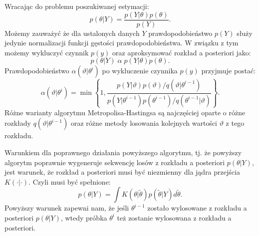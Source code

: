 Wracając do problemu poszukiwanej estymacji:
\begin{equation}
    p(\theta|Y) = \frac{p(Y|\theta)p(\theta)}{p(Y)}.
\end{equation}
Możemy zauważyć że dla ustalonych danych $Y$ prawdopodobieństwo $p(Y)$ służy jedynie normalizacji funkcji gęstości prawdopodobieństwa. W związku z tym możemy wykluczyć czynnik $p(y)$ oraz aproksymować rozkład a posteriori jako:
\begin{equation}
    p(\theta|Y)\;\alpha\;p(Y|\theta)p(\theta).
\end{equation}
Prawdopodobieństwo $\alpha(\vartheta | \theta^i)$ po wykluczenie czynnika $p(y)$ przyjmuje postać:
\begin{equation}
    \alpha(\vartheta|\theta^i) = \min \left\{ 1, \frac{p(Y|\vartheta)p(\vartheta)/q(\vartheta|\theta^{i-1})}{p(Y|\theta^{i-1})p(\theta^{i-1})/q(\theta^{i-1}|\vartheta)}\right\}.
\end{equation}
Różne warianty algorytmu Metropolisa-Hastingsa są najczęściej oparte o różne rozkłady $q(\vartheta|\theta^{i-1})$ oraz różne metody losowania kolejnych wartości $\vartheta$ z tego rozkładu. 

Warunkiem dla poprawnego działania powyższego algorytmu, tj. że powyższy algorytm poprawnie wygeneruje sekwencję losów z rozkładu a posteriori $p(\theta|Y)$, jest warunek, że rozkład a posteriori musi być niezmienny dla jądra przejścia $K(\cdot|\cdot)$. Czyli musi być spełnione:
\begin{equation}
    \label{eqn:transitionKernelToProof}
    p(\theta|Y) = \int K(\theta|\widetilde{\theta})p(\widetilde{\theta}|Y)d\widetilde{\theta}.
\end{equation}
Powyższy warunek zapewni nam, że jeśli $\theta^{i-1}$ zostało wylosowane z rozkładu a posteriori $p(\theta|Y)$, wtedy próbka $\theta^{i}$ też zostanie wylosowana z rozkładu a posteriori.

